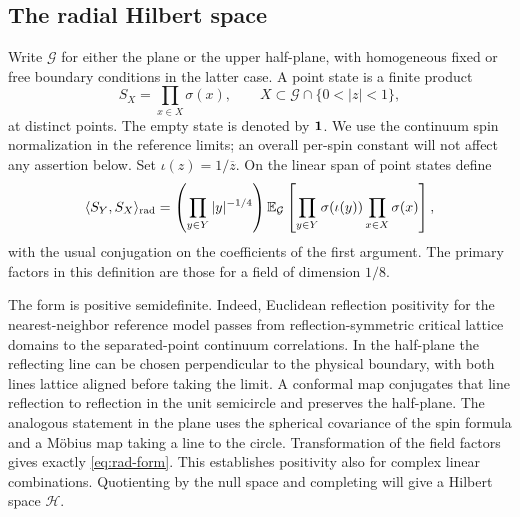 \subsection{The radial Hilbert space}

Write $\mathcal G$ for either the plane or the upper half-plane, with
homogeneous fixed or free boundary conditions in the latter case.  A
point state is a finite product
\[
   S_X=\prod_{x\in X}\sigma(x),
   \qquad X\subset\mathcal G\cap\{0<|z|<1\},
\]
at distinct points.  The empty state is denoted by $\mathbf 1$.  We use the
continuum spin normalization in the reference limits; an overall
per-spin constant will not affect any assertion below.  Set
$\iota(z)=1/\overline z$.  On the linear span of point states define
\begin{equation}
 \langle S_Y,S_X\rangle_{\rm rad}
 =\left(\prod_{y\in Y}|y|^{-1/4}\right)
   \mathbb E_{\mathcal G}\left[
       \prod_{y\in Y}\sigma(\iota(y))\prod_{x\in X}\sigma(x)
   \right],
 \label{eq:rad-form}
\end{equation}
with the usual conjugation on the coefficients of the first argument.
The primary factors in this definition are those for a field of
dimension $1/8$.

The form is positive semidefinite.  Indeed, Euclidean reflection
positivity for the nearest-neighbor reference model
\cite{FILS1978} passes from reflection-symmetric critical lattice domains to
the separated-point continuum correlations.  In the half-plane the
reflecting line can be chosen perpendicular to the physical boundary,
with both lines lattice aligned before taking the limit.  A conformal
map conjugates that line reflection to reflection in the unit
semicircle and preserves the half-plane.  The analogous statement in
the plane uses the spherical covariance of the spin formula and a
M\"obius map taking a line to the circle.  Transformation of the field
factors gives exactly \eqref{eq:rad-form}.  This establishes positivity
also for complex linear combinations.  Quotienting by the null space
and completing will give a Hilbert space $\mathcal H$.

